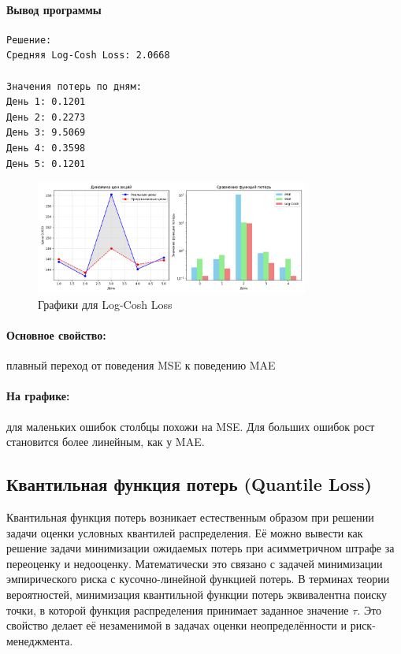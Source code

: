 \paragraph{Вывод программы}
\begin{verbatim}
Решение:
Средняя Log-Cosh Loss: 2.0668

Значения потерь по дням:
День 1: 0.1201
День 2: 0.2273
День 3: 9.5069
День 4: 0.3598
День 5: 0.1201
\end{verbatim}
\begin{figure}[h!]
    \centering
    \includegraphics[width=0.8\textwidth]{chapters/general/imgs/log_cosh.png}
    \caption{Графики для Log-Cosh Loss}
\end{figure}

\paragraph{Основное свойство:} плавный переход от поведения MSE к поведению MAE

\paragraph{На графике:} для маленьких ошибок столбцы похожи на MSE. Для больших ошибок рост становится более линейным, как у MAE.

\subsection{Квантильная функция потерь (Quantile Loss)}

Квантильная функция потерь возникает естественным образом при решении задачи оценки условных квантилей распределения. Её можно вывести как решение задачи минимизации ожидаемых потерь при асимметричном штрафе за переоценку и недооценку. Математически это связано с задачей минимизации эмпирического риска с кусочно-линейной функцией потерь. В терминах теории вероятностей, минимизация квантильной функции потерь эквивалентна поиску точки, в которой функция распределения принимает заданное значение $\tau$. Это свойство делает её незаменимой в задачах оценки неопределённости и риск-менеджмента.

